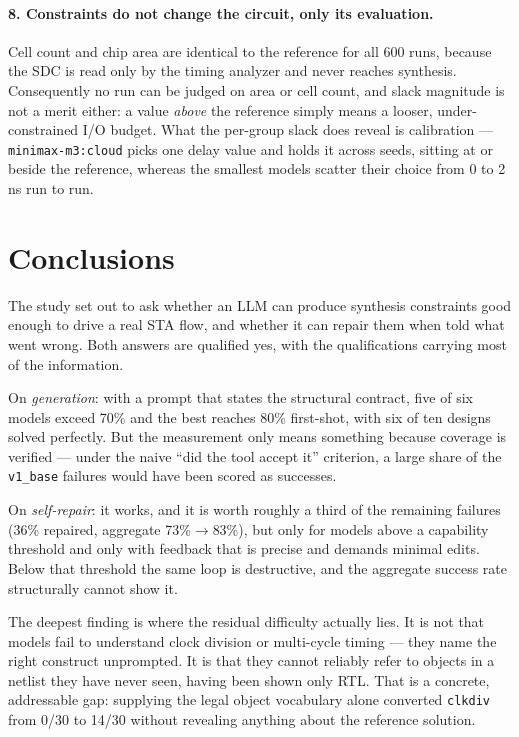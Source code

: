 \documentclass[11pt]{article}
\begin{document}
\paragraph{8. Constraints do not change the circuit, only its evaluation.} Cell count and chip area are identical to the reference for all 600 runs, because the SDC is read only by the timing analyzer and never reaches synthesis. Consequently no run can be judged on area or cell count, and slack magnitude is not a merit either: a value \emph{above} the reference simply means a looser, under-constrained I/O budget. What the per-group slack does reveal is calibration --- \texttt{minimax-m3:cloud} picks one delay value and holds it across seeds, sitting at or beside the reference, whereas the smallest models scatter their choice from 0 to 2\,ns run to run.

\section*{Conclusions}
The study set out to ask whether an LLM can produce synthesis constraints good enough to drive a real STA flow, and whether it can repair them when told what went wrong. Both answers are qualified yes, with the qualifications carrying most of the information.

On \emph{generation}: with a prompt that states the structural contract, five of six models exceed 70\% and the best reaches 80\% first-shot, with six of ten designs solved perfectly. But the measurement only means something because coverage is verified --- under the naive ``did the tool accept it'' criterion, a large share of the \texttt{v1\_base} failures would have been scored as successes.

On \emph{self-repair}: it works, and it is worth roughly a third of the remaining failures (36\% repaired, aggregate 73\%$\to$83\%), but only for models above a capability threshold and only with feedback that is precise and demands minimal edits. Below that threshold the same loop is destructive, and the aggregate success rate structurally cannot show it.

The deepest finding is where the residual difficulty actually lies. It is not that models fail to understand clock division or multi-cycle timing --- they name the right construct unprompted. It is that they cannot reliably refer to objects in a netlist they have never seen, having been shown only RTL. That is a concrete, addressable gap: supplying the legal object vocabulary alone converted \texttt{clkdiv} from 0/30 to 14/30 without revealing anything about the reference solution.
\end{document}
